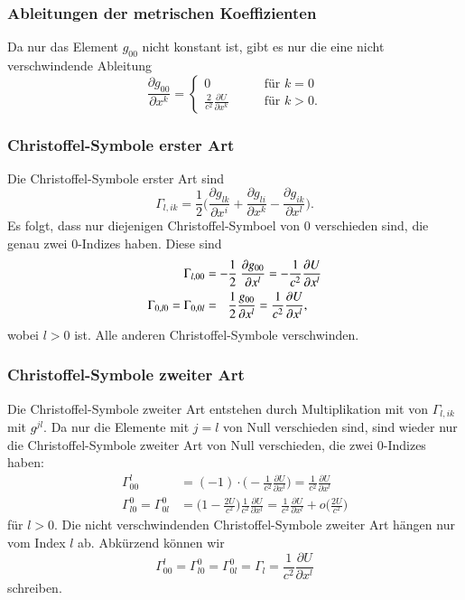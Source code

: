 \subsubsection{Ableitungen der metrischen Koeffizienten}
Da nur das Element $g_{00}$ nicht konstant ist, gibt es nur die eine
nicht verschwindende Ableitung
\[
\frac{\partial g_{00}}{\partial x^k}
=
\begin{cases}
0
&\qquad\text{für $k=0$}\\[4pt]
\displaystyle
\frac{2}{c^2}
\frac{\partial U}{\partial x^k}
&\qquad\text{für $k>0$.}
\end{cases}
\]

%
%
\subsubsection{Christoffel-Symbole erster Art}
Die Christoffel-Symbole erster Art sind
\[
\Gamma_{l,ik}
=
\frac{1}{2}\biggl(
\frac{\partial g_{lk}}{\partial x^i}
+
\frac{\partial g_{li}}{\partial x^k}
-
\frac{\partial g_{ik}}{\partial x^l}
\biggr).
\]
Es folgt, dass nur diejenigen Christoffel-Symboel von $0$ verschieden
sind, die genau zwei $0$-Indizes haben.
Diese sind
\begin{align}
\Gamma_{l,00}
&=
-\frac12 \frac{\partial g_{00}}{\partial x^l}
=
-
\frac{1}{c^2}\frac{\partial U}{\partial x^l}
\notag
\\
\Gamma_{0,l0}
=
\Gamma_{0,0l}
&=
\phantom{-}
\frac{1}{2}\frac{g_{00}}{\partial x^l}
=
\frac{1}{c^2}\frac{\partial U}{\partial x^l},
\label{buch:kruemmung:newton:eqn:bewegungsgleichung}
\end{align}
wobei $l>0$ ist.
Alle anderen Christoffel-Symbole verschwinden.

%
%
\subsubsection{Christoffel-Symbole zweiter Art}
Die Christoffel-Symbole zweiter Art entstehen durch Multiplikation
mit von $\Gamma_{l,ik}$ mit $g^{jl}$.
Da nur die Elemente mit $j=l$ von Null verschieden sind, sind wieder
nur die Christoffel-Symbole zweiter Art von Null verschieden, die zwei
$0$-Indizes haben:
\begin{align*}
\Gamma^l_{00}
&=
(-1)\cdot\biggl(-\frac{1}{c^2}\frac{\partial U}{\partial x^l}\biggr)
=
\frac{1}{c^2}\frac{\partial U}{\partial x^l}
\\
\Gamma^0_{l0}
=
\Gamma^0_{0l}
&=
\biggl(1-\frac{2U}{c^2}\biggr)
\frac{1}{c^2}\frac{\partial U}{\partial x^l}
=
\frac{1}{c^2}\frac{\partial U}{\partial x^l}
+
o\biggl(
\frac{2U}{c^2}
\biggr)
\end{align*}
für $l>0$.
Die nicht verschwindenden Christoffel-Symbole zweiter Art hängen nur
vom Index $l$ ab.
Abkürzend können wir
\[
\Gamma^l_{00}
=
\Gamma^0_{l0}
=
\Gamma^0_{0l}
=
\Gamma_l
= 
\frac{1}{c^2} \frac{\partial U}{\partial x^l}
\]
schreiben.

